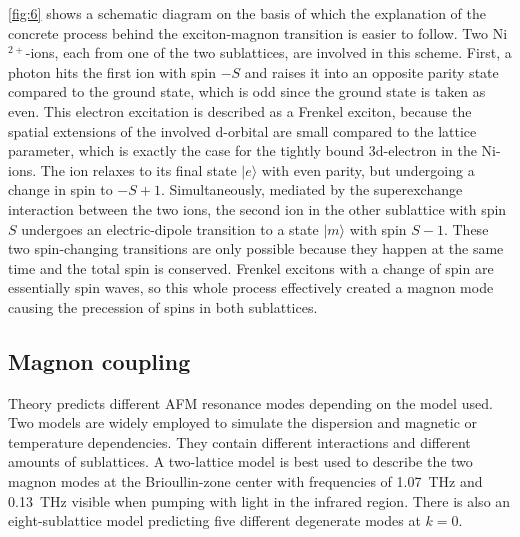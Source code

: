 \FloatBarrier
\autoref{fig:6} shows a schematic diagram on the basis of which the explanation of the concrete process behind the exciton-magnon transition is easier to follow.
Two Ni$^{2+}$-ions, each from one of the two sublattices, are involved in this scheme.
First, a photon hits the first ion with spin $-S$ and raises it into an opposite parity state compared to the ground state, which is odd since the ground state is taken as even.
This electron excitation is described as a Frenkel exciton, because the spatial extensions of the involved d-orbital are small compared to the lattice parameter, which is exactly the case for the tightly bound 3d-electron in the Ni-ions.
The ion relaxes to its final state $|e\rangle$ with even parity, but undergoing a change in spin to $-S+1$.
Simultaneously, mediated by the superexchange interaction between the two ions, the second ion in the other sublattice with spin $S$ undergoes an electric-dipole transition to a state $|m\rangle$ with spin $S-1$.
These two spin-changing transitions are only possible because they happen at the same time and the total spin is conserved.
Frenkel excitons with a change of spin are essentially spin waves, so this whole process effectively created a magnon mode causing the precession of spins in both sublattices.

\subsection{Magnon coupling}
\label{sec:mode_coupling}
Theory predicts different AFM resonance modes depending on the model used.
Two models are widely employed to simulate the dispersion and magnetic or temperature dependencies.
They contain different interactions and different amounts of sublattices.
A two-lattice model is best used to describe the two magnon modes at the Brioullin-zone center with frequencies of \qty{1.07}{THz} and \qty{0.13}{THz} visible when pumping with light in the infrared region.
There is also an eight-sublattice model predicting five different degenerate modes at $k=0$. 

